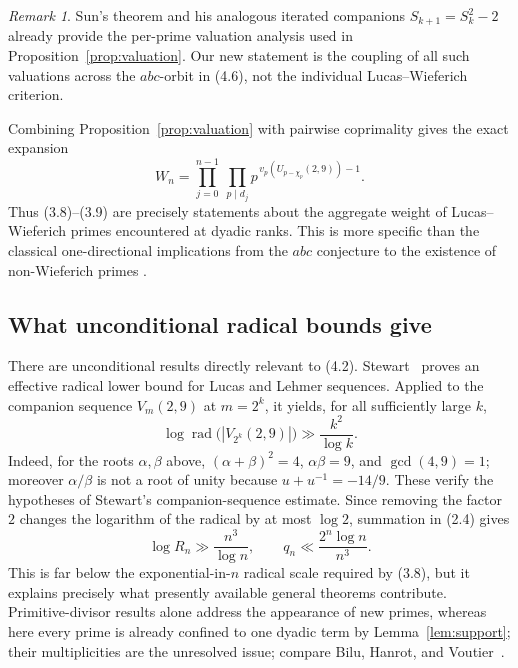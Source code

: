 \documentclass[11pt]{article}
\theoremstyle{remark}
\newtheorem{remark}[theorem]{Remark}
\newcommand{\rad}{\operatorname{rad}}
\begin{document}
\begin{remark}
Sun's theorem and his analogous iterated companions
\(S_{k+1}=S_k^2-2\) already provide the per-prime valuation analysis
used in Proposition~\ref{prop:valuation}.  Our new statement is the
coupling of all such valuations across the \(abc\)-orbit in (4.6), not
the individual Lucas--Wieferich criterion.
\end{remark}

Combining Proposition~\ref{prop:valuation} with pairwise coprimality
gives the exact expansion
\[
 \boxed{\quad
 W_n=\prod_{j=0}^{n-1}\ \prod_{p\mid d_j}
 p^{\,v_p(U_{p-\chi_p}(2,9))-1}.
 \quad}                                                    \tag{4.6}
\]
Thus (3.8)--(3.9) are precisely statements about the aggregate weight of
Lucas--Wieferich primes encountered at dyadic ranks.  This is more
specific than the classical one-directional implications from the
\(abc\) conjecture to the existence of non-Wieferich primes
\cite{Silverman1988,RibenboimWalsh1999,Yabuta2007}.

\subsection{What unconditional radical bounds give}

There are unconditional results directly relevant to (4.2).
Stewart~\cite[Theorem~1]{Stewart1983} proves an effective radical lower
bound for Lucas and Lehmer sequences.  Applied to the companion sequence
\(V_m(2,9)\) at \(m=2^k\), it yields, for all sufficiently large \(k\),
\[
 \log\rad\bigl(|V_{2^k}(2,9)|\bigr)
 \gg \frac{k^2}{\log k}.                                  \tag{4.7}
\]
Indeed, for the roots \(\alpha,\beta\) above,
\((\alpha+\beta)^2=4\), \(\alpha\beta=9\), and
\(\gcd(4,9)=1\); moreover \(\alpha/\beta\) is not a root of unity
because \(u+u^{-1}=-14/9\).  These verify the hypotheses of Stewart's
companion-sequence estimate.
Since removing the factor \(2\) changes the logarithm of the radical by
at most \(\log2\), summation in (2.4) gives
\[
 \log R_n\gg\frac{n^3}{\log n},\qquad
 q_n\ll\frac{2^n\log n}{n^3}.                             \tag{4.8}
\]
This is far below the exponential-in-\(n\) radical scale required by
(3.8), but it explains precisely what presently available general
theorems contribute.  Primitive-divisor results alone address the
appearance of new primes, whereas here every prime is already confined
to one dyadic term by Lemma~\ref{lem:support}; their multiplicities are
the unresolved issue; compare Bilu, Hanrot, and
Voutier~\cite{BiluHanrotVoutier2001}.
\end{document}
